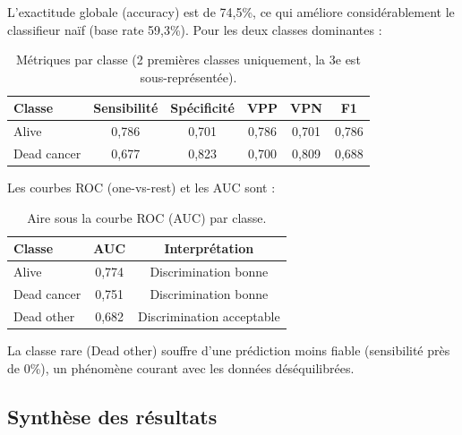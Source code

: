 \documentclass[12pt,a4paper]{article}
\begin{document}
L'exactitude globale (accuracy) est de 74{,}5\%, ce qui améliore considérablement le classifieur naïf (base rate 59{,}3\%). Pour les deux classes dominantes :

\begin{table}[H]
\centering
\caption{Métriques par classe (2 premières classes uniquement, la 3e est sous-représentée).}
\label{tab:metriques_classe}
\begin{tabular}{@{}lccccc@{}}
\toprule
\textbf{Classe} & \textbf{Sensibilité} & \textbf{Spécificité} & \textbf{VPP} & \textbf{VPN} & \textbf{F1} \\
\midrule
Alive & 0{,}786 & 0{,}701 & 0{,}786 & 0{,}701 & 0{,}786 \\
Dead cancer & 0{,}677 & 0{,}823 & 0{,}700 & 0{,}809 & 0{,}688 \\
\bottomrule
\end{tabular}
\end{table}

Les courbes ROC (one-vs-rest) et les AUC sont :

\begin{table}[H]
\centering
\caption{Aire sous la courbe ROC (AUC) par classe.}
\label{tab:auc_table}
\begin{tabular}{@{}lcc@{}}
\toprule
\textbf{Classe} & \textbf{AUC} & \textbf{Interprétation} \\
\midrule
Alive & 0{,}774 & Discrimination bonne \\
Dead cancer & 0{,}751 & Discrimination bonne \\
Dead other & 0{,}682 & Discrimination acceptable \\
\bottomrule
\end{tabular}
\end{table}

La classe rare (Dead other) souffre d'une prédiction moins fiable (sensibilité près de 0\%), un phénomène courant avec les données déséquilibrées.

\subsection{Synthèse des résultats}
\end{document}
